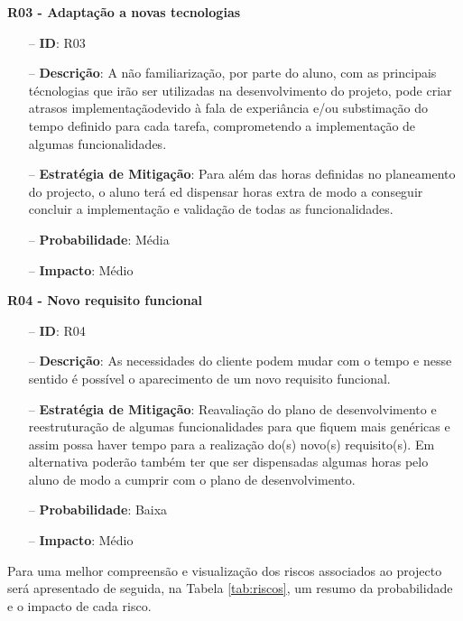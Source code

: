 \textbf{R03 - Adaptação a novas tecnologias }
\begin{itemize}
	\item[--] \textbf{ID}: R03
	\item[--] \textbf{Descrição}: A não familiarização, por parte do aluno, com as principais técnologias que irão ser utilizadas na desenvolvimento do projeto, pode criar atrasos implementaçãodevido à fala de experiância e/ou substimação do tempo definido para cada tarefa, comprometendo a implementação de algumas funcionalidades.
	\item[--] \textbf{Estratégia de Mitigação}: Para além das horas definidas no planeamento do projecto, o aluno terá ed dispensar horas extra de modo a conseguir concluir a implementação e validação de todas as funcionalidades.
	\item[--] \textbf{Probabilidade}: Média
	\item[--] \textbf{Impacto}: Médio
\end{itemize}

\textbf{R04 - Novo requisito funcional}
\begin{itemize}
	\item[--] \textbf{ID}: R04
	\item[--] \textbf{Descrição}: As necessidades do cliente podem mudar com o tempo e nesse sentido é possível o aparecimento de um novo requisito funcional.
	\item[--] \textbf{Estratégia de Mitigação}: Reavaliação do plano de desenvolvimento e reestruturação de algumas funcionalidades para que fiquem mais genéricas e assim possa haver tempo para a realização do(s) novo(s) requisito(s). Em alternativa poderão também ter que ser dispensadas algumas horas pelo aluno de modo a cumprir com o plano de desenvolvimento.
	\item[--] \textbf{Probabilidade}: Baixa 
	\item[--] \textbf{Impacto}: Médio
\end{itemize}

Para uma melhor compreensão e visualização dos riscos associados ao projecto será apresentado de seguida, na Tabela \ref{tab:riscos}, um resumo da probabilidade e o impacto de cada risco.

